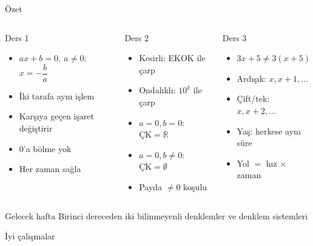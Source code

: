 \documentclass[aspectratio=169,11pt,handout]{beamer}
\begin{document}
\begin{frame}{Özet}
\begin{columns}[t]
\begin{block}{Ders 1}
\small
\begin{itemize}
\item \(ax+b=0,\ a\neq0\): \(x=-\dfrac{b}{a}\)
\item İki tarafa aynı işlem
\item Karşıya geçen işaret değiştirir
\item \(0\)'a bölme yok
\item Her zaman sağla
\end{itemize}
\end{block}
\begin{block}{Ders 2}
\small
\begin{itemize}
\item Kesirli: EKOK ile çarp
\item Ondalıklı: \(10^{k}\) ile çarp
\item \(a=0,b=0\): \(\text{ÇK}=\mathbb{R}\)
\item \(a=0,b\neq0\): \(\text{ÇK}=\emptyset\)
\item Payda \(\neq 0\) koşulu
\end{itemize}
\end{block}
\begin{block}{Ders 3}
\small
\begin{itemize}
\item \(3x+5\neq 3(x+5)\)
\item Ardışık: \(x, x+1, \dots\)
\item Çift/tek: \(x, x+2, \dots\)
\item Yaş: herkese aynı süre
\item Yol \(=\) hız \(\times\) zaman
\end{itemize}
\end{block}
\end{columns}
\vspace{6pt}
\begin{alertblock}{Gelecek hafta}
Birinci dereceden iki bilinmeyenli denklemler ve denklem sistemleri
\end{alertblock}
\end{frame}

\begin{frame}
\centering\Large İyi çalışmalar
\end{frame}
\end{document}
